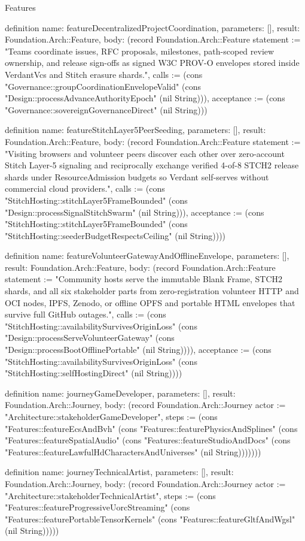\begin{lexlean}{Features}
\begin{semanticmodule}
definition{
  name: featureDecentralizedProjectCoordination,
  parameters: [],
  result: Foundation.Arch::Feature,
  body: (record Foundation.Arch::Feature {statement := "Teams coordinate issues, RFC proposals, milestones, path-scoped review ownership, and release sign-offs as signed W3C PROV-O envelopes stored inside VerdantVcs and Stitch erasure shards.", calls := (cons "Governance::groupCoordinationEnvelopeValid" (cons "Design::processAdvanceAuthorityEpoch" (nil String))), acceptance := (cons "Governance::sovereignGovernanceDirect" (nil String))})
}

definition{
  name: featureStitchLayer5PeerSeeding,
  parameters: [],
  result: Foundation.Arch::Feature,
  body: (record Foundation.Arch::Feature {statement := "Visiting browsers and volunteer peers discover each other over zero-account Stitch Layer-5 signaling and reciprocally exchange verified 4-of-8 STCH2 release shards under ResourceAdmission budgets so Verdant self-serves without commercial cloud providers.", calls := (cons "StitchHosting::stitchLayer5FrameBounded" (cons "Design::processSignalStitchSwarm" (nil String))), acceptance := (cons "StitchHosting::stitchLayer5FrameBounded" (cons "StitchHosting::seederBudgetRespectsCeiling" (nil String)))})
}

definition{
  name: featureVolunteerGatewayAndOfflineEnvelope,
  parameters: [],
  result: Foundation.Arch::Feature,
  body: (record Foundation.Arch::Feature {statement := "Community hosts serve the immutable Blank Frame, STCH2 shards, and all six stakeholder parts from zero-registration volunteer HTTP and OCI nodes, IPFS, Zenodo, or offline OPFS and portable HTML envelopes that survive full GitHub outages.", calls := (cons "StitchHosting::availabilitySurvivesOriginLoss" (cons "Design::processServeVolunteerGateway" (cons "Design::processBootOfflinePortable" (nil String)))), acceptance := (cons "StitchHosting::availabilitySurvivesOriginLoss" (cons "StitchHosting::selfHostingDirect" (nil String)))})
}

definition{
  name: journeyGameDeveloper,
  parameters: [],
  result: Foundation.Arch::Journey,
  body: (record Foundation.Arch::Journey {actor := "Architecture::stakeholderGameDeveloper", steps := (cons "Features::featureEcsAndBvh" (cons "Features::featurePhysicsAndSplines" (cons "Features::featureSpatialAudio" (cons "Features::featureStudioAndDocs" (cons "Features::featureLawfulHdCharactersAndUniverses" (nil String))))))})
}

definition{
  name: journeyTechnicalArtist,
  parameters: [],
  result: Foundation.Arch::Journey,
  body: (record Foundation.Arch::Journey {actor := "Architecture::stakeholderTechnicalArtist", steps := (cons "Features::featureProgressiveUorcStreaming" (cons "Features::featurePortableTensorKernels" (cons "Features::featureGltfAndWgsl" (nil String))))})
}


\end{semanticmodule}
\end{lexlean}
